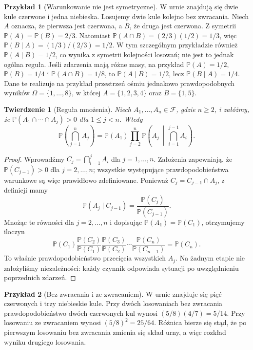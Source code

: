 \documentclass[11pt,a4paper,oneside]{report}
\numberwithin{equation}{chapter}
\theoremstyle{plain}
\newtheorem{twierdzenie}{Twierdzenie}[chapter]
\theoremstyle{definition}
\newtheorem{przyklad}{Przykład}[chapter]
\theoremstyle{remark}
\newcommand{\Prob}{\mathbb{P}}
\begin{document}
\begin{przyklad}[Warunkowanie nie jest symetryczne]
W urnie znajdują się dwie kule czerwone i jedna niebieska.
Losujemy dwie kule kolejno bez zwracania. Niech $A$ oznacza,
że pierwsza jest czerwona, a $B$, że druga jest czerwona.
Z symetrii $\Prob(A)=\Prob(B)=2/3$.
Natomiast
$\Prob(A\cap B)=(2/3)(1/2)=1/3$, więc
$\Prob(B\mid A)=(1/3)/(2/3)=1/2$.
W tym szczególnym przykładzie również $\Prob(A\mid B)=1/2$,
co wynika z symetrii kolejności losowań; nie jest to jednak
ogólna reguła. Jeśli zdarzenia mają różne masy, na przykład
$\Prob(A)=1/2$, $\Prob(B)=1/4$ i
$\Prob(A\cap B)=1/8$, to
$\Prob(A\mid B)=1/2$, lecz $\Prob(B\mid A)=1/4$.
Dane te realizuje na przykład przestrzeń ośmiu
jednakowo prawdopodobnych wyników $\Omega=\{1,\ldots,8\}$,
w której $A=\{1,2,3,4\}$ oraz $B=\{1,5\}$.
\end{przyklad}

\begin{twierdzenie}[Reguła mnożenia]
Niech $A_1,\ldots,A_n\in\mathcal F$, gdzie $n\geq2$, i załóżmy,
że $\Prob(A_1\cap\cdots\cap A_{j})>0$ dla $1\leq j<n$.
Wtedy
\[
\Prob\!\left(\bigcap_{j=1}^n A_j\right)
=\Prob(A_1)\prod_{j=2}^n
\Prob\!\left(A_j\,\middle|\,\bigcap_{i=1}^{j-1}A_i\right).
\]
\end{twierdzenie}
\begin{proof}
Wprowadźmy $C_j=\bigcap_{i=1}^j A_i$ dla
$j=1,\ldots,n$. Założenia zapewniają,
że $\Prob(C_{j-1})>0$ dla $j=2,\ldots,n$;
wszystkie występujące prawdopodobieństwa warunkowe
są więc prawidłowo zdefiniowane. Ponieważ
$C_j=C_{j-1}\cap A_j$, z definicji mamy
\[
\Prob(A_j\mid C_{j-1})
=\frac{\Prob(C_j)}{\Prob(C_{j-1})}.
\]
Mnożąc te równości dla $j=2,\ldots,n$ i dopisując
$\Prob(A_1)=\Prob(C_1)$, otrzymujemy iloczyn
\[
\Prob(C_1)\frac{\Prob(C_2)}{\Prob(C_1)}
\frac{\Prob(C_3)}{\Prob(C_2)}\cdots
\frac{\Prob(C_n)}{\Prob(C_{n-1})}=\Prob(C_n).
\]
To właśnie prawdopodobieństwo przecięcia wszystkich $A_j$.
Na żadnym etapie nie założyliśmy niezależności:
każdy czynnik odpowiada sytuacji po uwzględnieniu
poprzednich zdarzeń.
\end{proof}

\begin{przyklad}[Bez zwracania i ze zwracaniem]
W urnie znajduje się pięć czerwonych i trzy niebieskie kule.
Przy dwóch losowaniach bez zwracania prawdopodobieństwo dwóch
czerwonych kul wynosi $(5/8)(4/7)=5/14$.
Przy losowaniu ze zwracaniem wynosi $(5/8)^2=25/64$.
Różnica bierze się stąd, że po pierwszym losowaniu bez zwracania
zmienia się skład urny, a więc rozkład wyniku drugiego losowania.
\end{przyklad}
\end{document}
